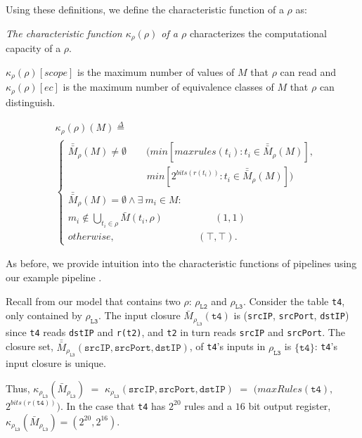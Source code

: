 Using these definitions, we define the characteristic function of a $\rho$ as:
\begin{definition} {\em The characteristic function $\kappa_\rho(\rho)$ of a $\rho$} characterizes the computational capacity of a $\rho$. 

$\kappa_\rho(\rho)[scope]$ is the maximum number of values of $M$ that $\rho$ can read and $\kappa_\rho(\rho)[ec]$ is the maximum number of equivalence classes of $M$ that $\rho$ can distinguish.

\begin{equation*}
\begin{split}
&\kappa_\rho(\rho)(M) \overset{\Delta}{=}\\
&\begin{cases}
\bar{\bar{M}}_\rho(M) \neq \emptyset \quad \quad (min[maxrules(t_i) : t_i \in \bar{\bar{M}}_\rho(M)],\\
\quad \quad \quad \quad \quad \quad \quad \quad  min[2^{bits(r(t_i))} : t_i \in \bar{\bar{M}}_\rho(M)])\\
\bar{\bar{M}}_\rho(M) = \emptyset \wedge \exists\ m_i \in M :\\
m_i \notin \bigcup_{t_i \in \rho} \bar{M}(t_i, \rho)\  \quad \quad \quad \quad \quad (1, 1)\\
otherwise, \quad \quad \quad \quad \quad \quad \quad \ \ \ \ \, \, \,  (\intercal, \intercal).
\end{cases}
\end{split}
\end{equation*}
\end{definition}

 As before, we provide intuition into the characteristic functions of pipelines using our example pipeline \exampledp.

Recall from our model that \exampledp{} contains two $\rho$: $\rho_{\texttt{L2}}$ and $\rho_{\texttt{L3}}$. Consider the table \texttt{t4}, only contained by $\rho_{\texttt{L3}}$. The input closure $\bar{M}_{\rho_{\texttt{L3}}}(\texttt{t4})$ is (\texttt{srcIP}, \texttt{srcPort}, \texttt{dstIP}) since \texttt{t4} reads \texttt{dstIP} and \texttt{r(t2)}, and \texttt{t2} in turn reads \texttt{srcIP} and \texttt{srcPort}. The closure set, $\bar{\bar{M}}_{\rho_\texttt{L3}}(\texttt{srcIP}, \texttt{srcPort}, \texttt{dstIP})$, of \texttt{t4}'s inputs in $\rho_{\texttt{L3}}$ is $\{\texttt{t4}\}$: \texttt{t4}'s input closure is unique.

Thus, $\kappa_{\rho_{\texttt{L3}}}(\bar{M}_{\rho_{\texttt{L3}}})$ $=$ $\kappa_{\rho_{\texttt{L3}}}(\texttt{srcIP}, \texttt{srcPort}, \texttt{dstIP})$ $=$ $(maxRules(\texttt{t4}),$ $2^{bits(r(\texttt{t4}))})$. In the case that \texttt{t4} has $2^{20}$ rules and a $16$ bit output register, $\kappa_{\rho_{\texttt{L3}}}(\bar{M}_{\rho_{\texttt{L3}}}) = (2^{20}, 2^{16})$.

